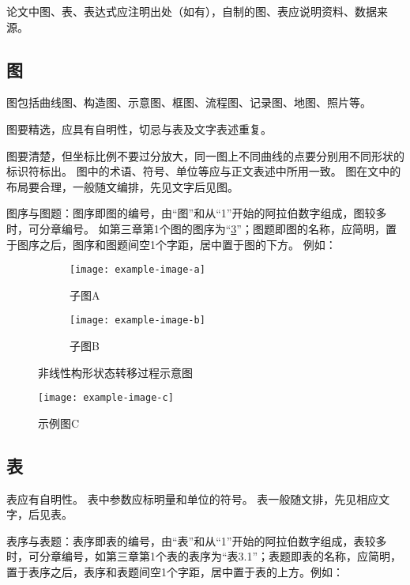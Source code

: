 论文中图、表、表达式应注明出处（如有），自制的图、表应说明资料、数据来源。

\subsection{图}

图包括曲线图、构造图、示意图、框图、流程图、记录图、地图、照片等。

图要精选，应具有自明性，切忌与表及文字表述重复。

图要清楚，但坐标比例不要过分放大，同一图上不同曲线的点要分别用不同形状的标识符标出。
图中的术语、符号、单位等应与正文表述中所用一致。
图在文中的布局要合理，一般随文编排，先见文字后见图。

图序与图题：图序即图的编号，由“图”和从“1”开始的阿拉伯数字组成，图较多时，可分章编号。
如第三章第1个图的图序为“\ref{fig:example}”；图题即图的名称，应简明，置于图序之后，图序和图题间空1个字距，居中置于图的下方。
例如：

\begin{figure}[H]
    \centering
    \begin{subfigure}[b]{0.4\linewidth}
        \centering
        \texttt{[image: example-image-a]}
        \caption{子图A}
        \label{fig:example-a}
    \end{subfigure}
    \quad
    \begin{subfigure}[b]{0.4\linewidth}
        \centering
        \texttt{[image: example-image-b]}
        \caption{子图B}
        \label{fig:example-b}
    \end{subfigure}
    \caption{非线性构形状态转移过程示意图}
    \label{fig:example}
\end{figure}

\begin{figure}[H]
    \centering
    \texttt{[image: example-image-c]}
    \caption{示例图C}
    \label{fig:example-c}
\end{figure}

\subsection{表}

表应有自明性。
表中参数应标明量和单位的符号。
表一般随文排，先见相应文字，后见表。

表序与表题：表序即表的编号，由“表”和从“1”开始的阿拉伯数字组成，表较多时，可分章编号，如第三章第1个表的表序为“表3.1”；表题即表的名称，应简明，置于表序之后，表序和表题间空1个字距，居中置于表的上方。例如：

